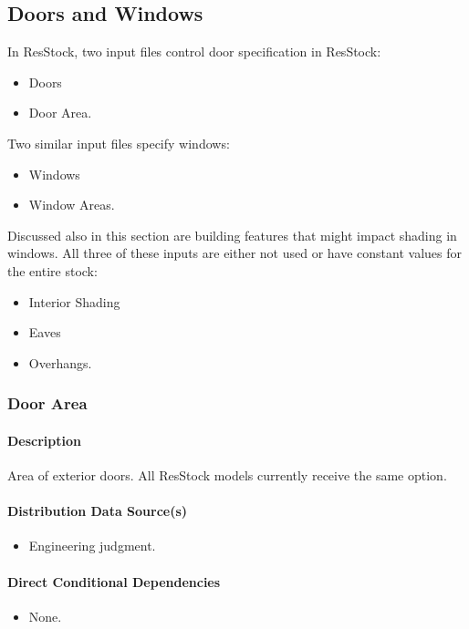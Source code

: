 
\subsection{Doors and Windows}
In ResStock, two input files control door specification in ResStock:
\begin{itemize}
    \item Doors
    \item Door Area.
\end{itemize}

Two similar input files specify windows:
\begin{itemize}
    \item Windows
    \item Window Areas.
\end{itemize}

Discussed also in this section are building features that might impact shading in windows. All three of these inputs are either not used or have constant values for the entire stock:
\begin{itemize}
    \item Interior Shading
    \item Eaves
    \item Overhangs.
\end{itemize}
\subsubsection{Door Area}\label{door_area}
\paragraph{Description}
Area of exterior doors. All ResStock models currently receive the same option.
\paragraph{Distribution Data Source(s)}
\begin{itemize}
 
\item
  Engineering judgment.
\end{itemize}
\paragraph{Direct Conditional Dependencies}
 
\begin{itemize}
    \item None.
\end{itemize}
